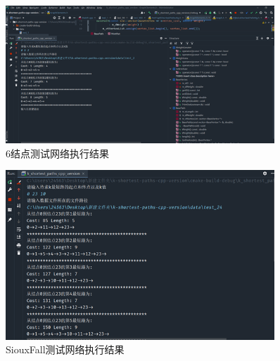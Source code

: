 \begin{figure}[H] %
    \centering %
    \includegraphics[width=0.9\textwidth]{png/图片23 6结点测试网络执行结果} %
    \caption{6结点测试网络执行结果} %
    \label{fig:fig23} %
\end{figure}

\begin{figure}[H] %
    \centering %
    \includegraphics[width=0.9\textwidth]{png/图片24 SiouxFall测试网络执行结果} %
    \caption{SiouxFall测试网络执行结果} %
    \label{fig:fig24} %
\end{figure}


